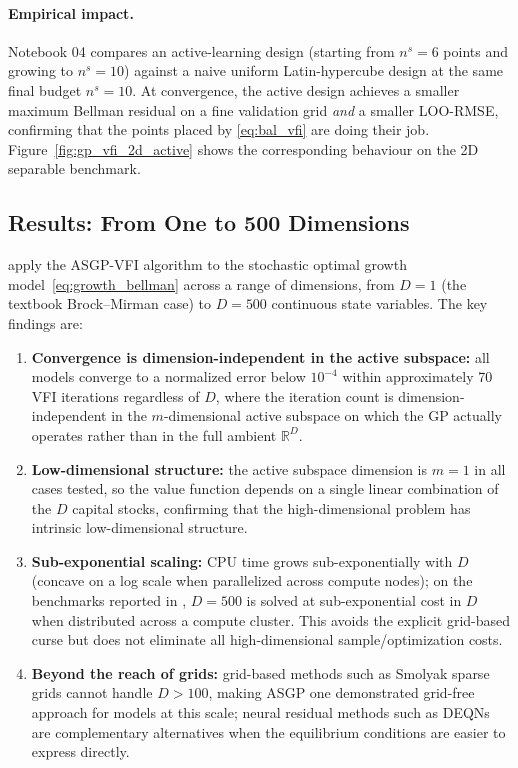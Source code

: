 \documentclass[11pt,a4paper]{report}
\newcommand{\R}{\mathbb{R}}
\begin{document}
\paragraph{Empirical impact.}
Notebook 04 compares an active-learning design (starting from $n^s=6$ points and growing to $n^s=10$) against a naive uniform Latin-hypercube design at the same final budget $n^s = 10$.  At convergence, the active design achieves a smaller maximum Bellman residual on a fine validation grid \emph{and} a smaller LOO-RMSE, confirming that the points placed by \eqref{eq:bal_vfi} are doing their job.  Figure~\ref{fig:gp_vfi_2d_active} shows the corresponding behaviour on the 2D separable benchmark.

\subsection{Results: From One to 500 Dimensions}

\citet{SCHEIDEGGER201968} apply the ASGP-VFI algorithm to the stochastic optimal growth model~\eqref{eq:growth_bellman} across a range of dimensions, from $D = 1$ (the textbook Brock--Mirman case) to $D = 500$ continuous state variables.  The key findings are:
\begin{enumerate}[itemsep=2pt]
\item \textbf{Convergence is dimension-independent in the active subspace:} all models converge to a normalized error below $10^{-4}$ within approximately 70 VFI iterations regardless of $D$, where the iteration count is dimension-independent in the $m$-dimensional active subspace on which the GP actually operates rather than in the full ambient $\R^D$.
\item \textbf{Low-dimensional structure:} the active subspace dimension is $m = 1$ in all cases tested, so the value function depends on a single linear combination of the $D$ capital stocks, confirming that the high-dimensional problem has intrinsic low-dimensional structure.
\item \textbf{Sub-exponential scaling:} CPU time grows sub-exponentially with $D$ (concave on a log scale when parallelized across compute nodes); on the benchmarks reported in \citet{SCHEIDEGGER201968}, $D = 500$ is solved at sub-exponential cost in $D$ when distributed across a compute cluster.  This avoids the explicit grid-based curse but does not eliminate all high-dimensional sample/optimization costs.
\item \textbf{Beyond the reach of grids:} grid-based methods such as Smolyak sparse grids cannot handle $D > 100$, making ASGP one demonstrated grid-free approach for models at this scale; neural residual methods such as DEQNs are complementary alternatives when the equilibrium conditions are easier to express directly.
\end{enumerate}
\end{document}
